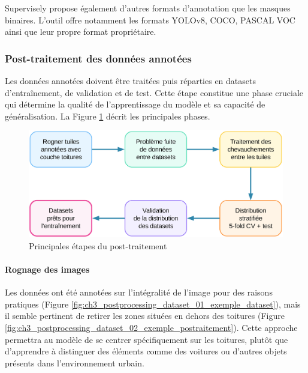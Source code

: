 Supervisely propose également d'autres formats d'annotation que les masques binaires. L'outil offre notamment les formats YOLOv8, COCO, PASCAL VOC ainsi que leur propre format propriétaire.

\subsubsection{Post-traitement des données annotées}
Les données annotées doivent être traitées puis réparties en datasets d'entraînement, de validation et de test. Cette étape constitue une phase cruciale qui détermine la qualité de l'apprentissage du modèle et sa capacité de généralisation. La Figure \ref{fig:ch3_postprocessing_dataset_03_overview} décrit les principales phases.
\begin{figure}[H]
    \centering
    \includegraphics[width=1\linewidth]{02-main/figures/ch3/ch3_postprocessing_dataset_03_overview.png}
    \caption{Principales étapes du post-traitement}
    \label{fig:ch3_postprocessing_dataset_03_overview}
\end{figure}

\paragraph{Rognage des images}
Les données ont été annotées sur l'intégralité de l'image pour des raisons pratiques (Figure \ref{fig:ch3_postprocessing_dataset_01_exemple_dataset}), mais il semble pertinent de retirer les zones situées en dehors des toitures (Figure \ref{fig:ch3_postprocessing_dataset_02_exemple_postraitement}). Cette approche permettra au modèle de se centrer spécifiquement sur les toitures, plutôt que d'apprendre à distinguer des éléments comme des voitures ou d'autres objets présents dans l'environnement urbain.

